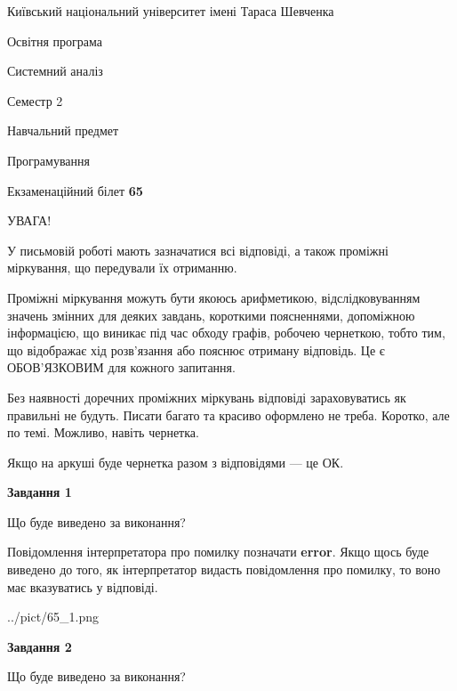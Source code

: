 \documentclass[12pt, ukrainian]{article}
\begin{document}
{{\begin {small}\par
{ \center  Київський національний університет імені Тараса Шевченка \par}
{\parbox {5 cm}{Освітня програма \hfill}{\parbox {7 cm}{Системний аналіз \hfill}}\parbox {6 cm}{\hfill Семестр 2}}\par
{\parbox {5 cm} {Навчальний предмет \hfill}\parbox {7 cm}{Програмування \hfill}\parbox {6cm}{\hfill}\par}\vspace{-7pt} \end{small}}{\center Екзаменаційний білет \No \textbf
{ 65 }\par}}
{
\begin {large}
УВАГА!

У письмовій роботі мають зазначатися всі відповіді, а також проміжні міркування, що передували їх отриманню.

Проміжні міркування можуть бути якоюсь арифметикою, відслідковуванням зна\-чень змінних для деяких завдань,
короткими поясненнями, допоміжною інформацією, що виникає під час обходу графів, робочею чернеткою,
тобто тим, що відображає хід розв’язання або пояснює отриману відповідь.
Це є ОБОВ’ЯЗКОВИМ для кожного запитання.

Без наявності доречних проміжних міркувань відповіді зараховуватись як правиль\-ні не будуть.
Писати багато та красиво оформлено не треба. Коротко, але по темі. Можли\-во, навіть чернетка.

Якщо на аркуші буде чернетка разом з відповідями --- це ОК.

\newpage

{\begin {center}\textbf{Завдання 1}\end {center}}\par
Що буде виведено за виконання?

Повідомлення інтерпретатора про помилку позначати \textbf{error}.
Якщо щось буде виведено до того, як інтерпретатор видасть повідомлення про помилку, 
то воно має вказуватись у відповіді. \par


\begin{center}
	{../pict/65_1.png}
\end{center}
\newpage

{\begin {center}\textbf{Завдання 2}\end {center}}\par
Що буде виведено за виконання?


\end{large}}
\end{document}
